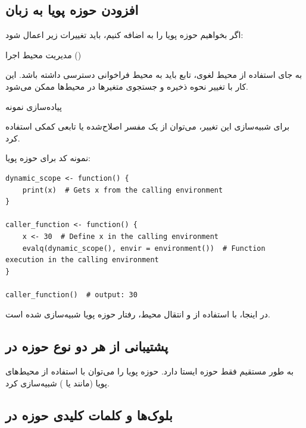 \documentclass[11pt, a4paper, oneside]{book}
\newcounter{itemadded}
\let\LaTeXStandardEnumerateBegin\enumerate
\let\LaTeXStandardEnumerateEnd\endenumerate
\renewenvironment{enumerate}{%
	\LaTeXStandardEnumerateBegin%
	\setcounter{itemadded}{0}
}{%
	\LaTeXStandardEnumerateEnd%
}%
\begin{document}
			\subsection{افزودن حوزه پویا به زبان }
				
				اگر بخواهیم حوزه پویا را به  اضافه کنیم، باید تغییرات زیر اعمال شود:
				
				\begin{enumerate}
					
					\item 
					{\large مدیریت محیط اجرا ()}
					
					
					به جای استفاده از محیط لغوی، تابع باید به محیط فراخوانی دسترسی داشته باشد.
					این کار با تغییر نحوه ذخیره و جستجوی متغیرها در محیط‌ها ممکن می‌شود.
					
					\item
					{\large پیاده‌سازی نمونه}
					
					
					برای شبیه‌سازی این تغییر، می‌توان از یک مفسر اصلاح‌شده یا تابعی کمکی استفاده کرد.
					
				\end{enumerate}
				
				نمونه کد برای حوزه پویا:
				
					\begin{latin}
						\begin{lstlisting}[caption={\lr{Adding a dynamic scope to R}}] 
dynamic_scope <- function() {
	print(x)  # Gets x from the calling environment
}

caller_function <- function() {
	x <- 30  # Define x in the calling environment
	evalq(dynamic_scope(), envir = environment())  # Function execution in the calling environment
}

caller_function()  # output: 30

						\end{lstlisting}
					\end{latin}
				در اینجا، با استفاده از  و انتقال محیط، رفتار حوزه پویا شبیه‌سازی شده است.
					
			
			\subsection{پشتیبانی از هر دو نوع حوزه در }
			
				 به طور مستقیم فقط حوزه ایستا دارد.
				حوزه پویا را می‌توان با استفاده از محیط‌های پویا (مانند  یا ) شبیه‌سازی کرد.
			
			\subsection{بلوک‌ها و کلمات کلیدی حوزه در }
				
\end{document}

